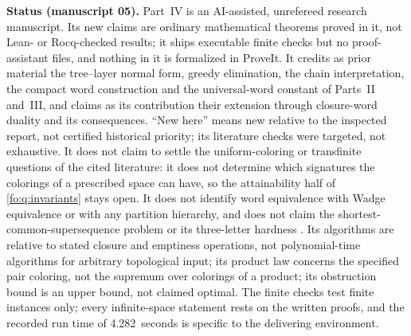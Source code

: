 \documentclass[11pt,letterpaper]{article}
\numberwithin{equation}{section}
\theoremstyle{definition}
\theoremstyle{remark}
\theoremstyle{definition}
\begin{document}
\begin{resultbox}
\textbf{Status (manuscript 05).} Part~IV is an AI-assisted, unrefereed
research manuscript. Its new claims are ordinary mathematical theorems proved
in it, not Lean- or Rocq-checked results; it ships executable finite checks
but no proof-assistant files, and nothing in it is formalized in ProveIt. It
credits as prior material the tree--layer normal form, greedy elimination,
the chain interpretation, the compact word construction and the
universal-word constant of Parts~II and~III, and claims as its contribution
their extension through closure-word duality and its consequences. ``New
here'' means new relative to the inspected report, not certified historical
priority; its literature checks were targeted, not exhaustive. It does not
claim to settle the uniform-coloring or transfinite questions of the cited
literature: it does not determine which signatures the colorings of a
prescribed space can have, so the attainability half of
\cref{fo:q:invariants} stays open. It does not identify word equivalence with
Wadge equivalence or with any partition hierarchy, and does not claim the
shortest-common-supersequence problem or its three-letter hardness
\cite{LT}. Its algorithms are relative to stated closure and emptiness
operations, not polynomial-time algorithms for arbitrary topological input;
its product law concerns the specified pair coloring, not the supremum over
colorings of a product; its obstruction bound is an upper bound, not claimed
optimal. The finite checks test finite instances only; every infinite-space
statement rests on the written proofs, and the recorded run time of
4.282~seconds is specific to the delivering environment.
\end{resultbox}
\end{document}
